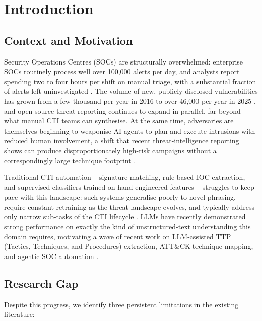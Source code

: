 \documentclass[runningheads]{llncs}
\begin{document}
\section{Introduction}
\label{sec:intro}

\subsection{Context and Motivation}

Security Operations Centres (SOCs) are structurally overwhelmed: enterprise SOCs routinely process well over 100{,}000 alerts per day, and analysts report spending two to four hours per shift on manual triage, with a substantial fraction of alerts left uninvestigated \cite{agentsoc2026}. The volume of new, publicly disclosed vulnerabilities has grown from a few thousand per year in 2016 to over 46{,}000 per year in 2025 \cite{llmmaspatterns2026}, and open-source threat reporting continues to expand in parallel, far beyond what manual CTI teams can synthesise. At the same time, adversaries are themselves beginning to weaponise AI agents to plan and execute intrusions with reduced human involvement, a shift that recent threat-intelligence reporting shows can produce disproportionately high-risk campaigns without a correspondingly large technique footprint \cite{anthropicattacknavigator2026}.

Traditional CTI automation -- signature matching, rule-based IOC extraction, and supervised classifiers trained on hand-engineered features -- struggles to keep pace with this landscape: such systems generalise poorly to novel phrasing, require constant retraining as the threat landscape evolves, and typically address only narrow sub-tasks of the CTI lifecycle \cite{hierrag2026}. LLMs have recently demonstrated strong performance on exactly the kind of unstructured-text understanding this domain requires, motivating a wave of recent work on LLM-assisted TTP (Tactics, Techniques, and Procedures) extraction, ATT\&CK technique mapping, and agentic SOC automation \cite{intelex2024,ctinexus2024,fayyazi2024,mitretrieval2024}.

\subsection{Research Gap}

Despite this progress, we identify three persistent limitations in the existing literature:
\end{document}
